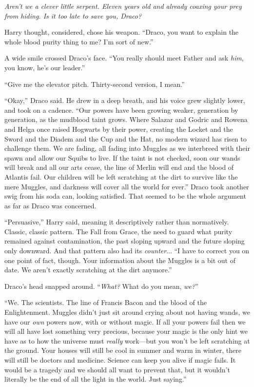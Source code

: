 \emph{Aren’t we a clever little serpent. Eleven years old and already coaxing your prey from hiding. Is it too late to save you, Draco?}

Harry thought, considered, chose his weapon. “Draco, you want to explain the whole blood purity thing to me? I’m sort of new.”

A wide smile crossed Draco’s face. “You really should meet Father and ask \emph{him}, you know, he’s our leader.”

“Give me the elevator pitch. Thirty-second version, I mean.”

“Okay,” Draco said. He drew in a deep breath, and his voice grew slightly lower, and took on a cadence. “Our powers have been growing weaker, generation by generation, as the mudblood taint grows. Where Salazar and Godric and Rowena and Helga once raised Hogwarts by their power, creating the Locket and the Sword and the Diadem and the Cup and the Hat, no modern wizard has risen to challenge them. We are fading, all fading into Muggles as we interbreed with their spawn and allow our Squibs to live. If the taint is not checked, soon our wands will break and all our arts cease, the line of Merlin will end and the blood of Atlantis fail. Our children will be left scratching at the dirt to survive like the mere Muggles, and darkness will cover all the world for ever.” Draco took another swig from his soda can, looking satisfied. That seemed to be the whole argument as far as Draco was concerned.

“Persuasive,” Harry said, meaning it descriptively rather than normatively. Classic, classic pattern. The Fall from Grace, the need to guard what purity remained against contamination, the past sloping upward and the future sloping only downward. And that pattern also had its \emph{counter}... “I have to correct you on one point of fact, though. Your information about the Muggles is a bit out of date. We aren’t exactly scratching at the dirt anymore.”

Draco’s head snapped around. “\emph{What?} What do you mean, \emph{we?}”

“We. The scientists. The line of Francis Bacon and the blood of the Enlightenment. Muggles didn’t just sit around crying about not having wands, we have our \emph{own} powers now, with or without magic. If all your powers fail then we will all have lost something very precious, because your magic is the only hint we have as to how the universe must \emph{really} work—but you won’t be left scratching at the ground. Your houses will still be cool in summer and warm in winter, there will still be doctors and medicine. Science can keep you alive if magic fails. It would be a tragedy and we should all want to prevent that, but it wouldn’t literally be the end of all the light in the world. Just saying.”

